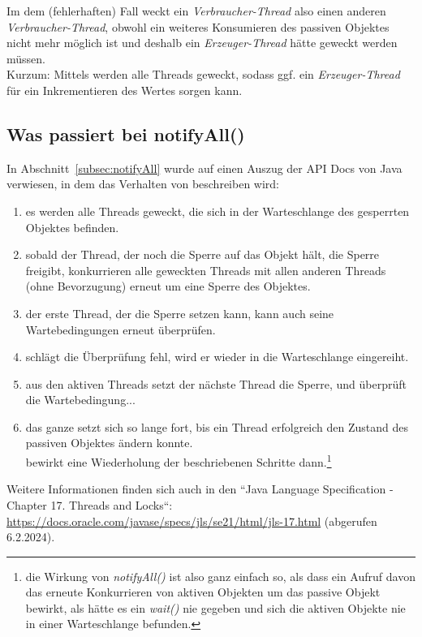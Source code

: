 \noindent
Im dem (fehlerhaften) Fall weckt ein \textit{Verbraucher-Thread} also einen anderen \textit{Verbraucher-Thread}, obwohl ein weiteres Konsumieren des passiven Objektes nicht mehr möglich ist und deshalb ein \textit{Erzeuger-Thread} hätte geweckt werden müssen.\\

\noindent
Kurzum: Mittels  werden alle Threads geweckt, sodass ggf. ein \textit{Erzeuger-Thread} für ein Inkrementieren des Wertes sorgen kann.

\subsection*{Was passiert bei notifyAll()}

In Abschnitt~\ref{subsec:notifyAll} wurde auf einen Auszug der API Docs von Java verwiesen, in dem das Verhalten von  beschreiben wird:

\begin{enumerate}
    \item es werden alle Threads geweckt, die sich in der Warteschlange des gesperrten Objektes befinden.
    \item sobald der Thread, der noch die Sperre auf das Objekt hält, die Sperre freigibt, konkurrieren alle geweckten Threads mit allen anderen Threads (ohne Bevorzugung) erneut um eine Sperre des Objektes.
    \item der erste Thread, der die Sperre setzen kann, kann auch seine Wartebedingungen erneut überprüfen.
    \item schlägt die Überprüfung fehl, wird er wieder in die Warteschlange eingereiht.
    \item aus den aktiven Threads setzt der nächste Thread die Sperre, und überprüft die Wartebedingung...
    \item das ganze setzt sich so lange fort, bis ein Thread erfolgreich den Zustand des passiven Objektes ändern konnte.\\
     bewirkt eine Wiederholung der beschriebenen Schritte dann.\footnote{
        die Wirkung von \textit{notifyAll()} ist also ganz einfach so, als dass ein Aufruf davon das erneute Konkurrieren von aktiven Objekten um das passive Objekt bewirkt, als hätte es ein \textit{wait()} nie gegeben und sich die aktiven Objekte nie in einer Warteschlange befunden.
    }
\end{enumerate}

Weitere Informationen finden sich auch in den ``Java Language Specification - Chapter 17. Threads and Locks``: \url{https://docs.oracle.com/javase/specs/jls/se21/html/jls-17.html} (abgerufen 6.2.2024).